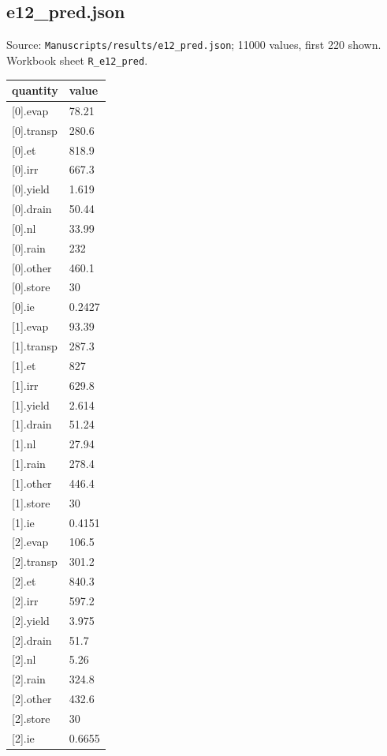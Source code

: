 \subsection*{e12\_pred.json}
\noindent\small Source: \nolinkurl{Manuscripts/results/e12_pred.json}; 11000 values, first 220 shown. Workbook sheet \texttt{R\_e12\_pred}.\par
{\scriptsize\begin{longtable}{p{}p{}}\toprule\textbf{quantity} & \textbf{value}\\\midrule\endhead
{}[0].evap & 78.21\\
{}[0].transp & 280.6\\
{}[0].et & 818.9\\
{}[0].irr & 667.3\\
{}[0].yield & 1.619\\
{}[0].drain & 50.44\\
{}[0].nl & 33.99\\
{}[0].rain & 232\\
{}[0].other & 460.1\\
{}[0].store & 30\\
{}[0].ie & 0.2427\\
{}[1].evap & 93.39\\
{}[1].transp & 287.3\\
{}[1].et & 827\\
{}[1].irr & 629.8\\
{}[1].yield & 2.614\\
{}[1].drain & 51.24\\
{}[1].nl & 27.94\\
{}[1].rain & 278.4\\
{}[1].other & 446.4\\
{}[1].store & 30\\
{}[1].ie & 0.4151\\
{}[2].evap & 106.5\\
{}[2].transp & 301.2\\
{}[2].et & 840.3\\
{}[2].irr & 597.2\\
{}[2].yield & 3.975\\
{}[2].drain & 51.7\\
{}[2].nl & 5.26\\
{}[2].rain & 324.8\\
{}[2].other & 432.6\\
{}[2].store & 30\\
{}[2].ie & 0.6655\\

\end{longtable}}
